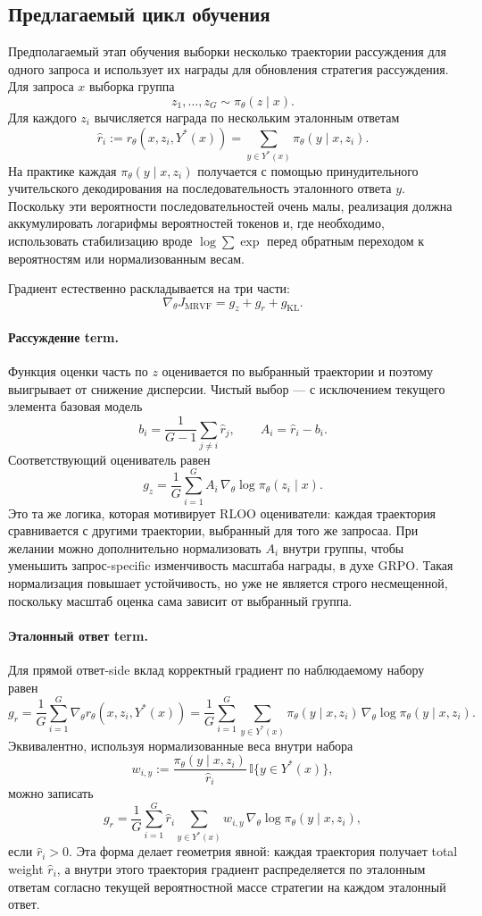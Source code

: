 \subsection{Предлагаемый цикл обучения}

Предполагаемый этап обучения выборки несколько траектории рассуждения для одного запроса и использует их награды для обновления стратегия рассуждения. Для запроса \(x\) выборка группа
\[
 z_1,\dots,z_G \sim \pi_{\theta}(z\mid x).
\]
Для каждого \(z_i\) вычисляется награда по нескольким эталонным ответам
\[
 \hat r_i
 :=
 r_{\theta}(x,z_i,Y^{*}(x))
 =
 \sum_{y\in Y^{*}(x)}
 \pi_{\theta}(y\mid x,z_i).
\]
На практике каждая \(\pi_{\theta}(y\mid x,z_i)\) получается с помощью принудительного учительского декодирования на последовательность эталонного ответа \(y\). Поскольку эти вероятности последовательностей очень малы, реализация должна аккумулировать логарифмы вероятностей токенов и, где необходимо, использовать стабилизацию вроде \(\log\sum\exp\) перед обратным переходом к вероятностям или нормализованным весам.

Градиент естественно раскладывается на три части:
\[
 \nabla_{\theta}J_{\mathrm{MRVF}}
 =
 g_{z}+g_{r}+g_{\mathrm{KL}}.
\]

\paragraph{Рассуждение term.}
Функция оценки часть по \(z\) оценивается по выбранный траектории и поэтому выигрывает от снижение дисперсии. Чистый выбор --- с исключением текущего элемента базовая модель
\[
 b_i
 =
 \frac{1}{G-1}\sum_{j\neq i}\hat r_j,
 \qquad
 A_i=\hat r_i-b_i.
\]
Соответствующий оцениватель равен
\[
 g_{z}
 =
 \frac{1}{G}\sum_{i=1}^{G}
 A_i\,\nabla_{\theta}\log\pi_{\theta}(z_i\mid x).
\]
Это та же логика, которая мотивирует RLOO оцениватели: каждая траектория сравнивается с другими траектории, выбранный для того же запросаа. При желании можно дополнительно нормализовать \(A_i\) внутри группы, чтобы уменьшить запрос-specific изменчивость масштаба награды, в духе GRPO. Такая нормализация повышает устойчивость, но уже не является строго несмещенной, поскольку масштаб оценка сама зависит от выбранный группа.

\paragraph{Эталонный ответ term.}
Для прямой ответ-side вклад корректный градиент по наблюдаемому набору равен
\[
 g_{r}
 =
 \frac{1}{G}\sum_{i=1}^{G}
 \nabla_{\theta}r_{\theta}(x,z_i,Y^{*}(x))
 =
 \frac{1}{G}\sum_{i=1}^{G}
 \sum_{y\in Y^{*}(x)}
 \pi_{\theta}(y\mid x,z_i)\,
 \nabla_{\theta}\log\pi_{\theta}(y\mid x,z_i).
\]
Эквивалентно, используя нормализованные веса внутри набора
\[
 w_{i,y}
 :=
 \frac{\pi_{\theta}(y\mid x,z_i)}
 {\hat r_i}
 \,\mathbb{I}\{y\in Y^{*}(x)\},
\]
можно записать
\[
 g_{r}
 =
 \frac{1}{G}\sum_{i=1}^{G}
 \hat r_i
 \sum_{y\in Y^{*}(x)}
 w_{i,y}\,
 \nabla_{\theta}\log\pi_{\theta}(y\mid x,z_i),
\]
если \(\hat r_i>0\). Эта форма делает геометрия явной: каждая траектория получает total weight \(\hat r_i\), а внутри этого траектория градиент распределяется по эталонным ответам согласно текущей вероятностной массе стратегии на каждом эталонный ответ.

